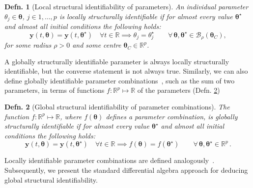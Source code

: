 \documentclass[12pt]{article}
\newtheorem{definition}{Defn.}
\begin{document}
\begin{definition}[Local structural identifiability of parameters]
  An individual parameter $\theta_{j}\in\boldsymbol{\theta}$, ${j}\in{1,\ldots,p}$ is locally \textit{structurally identifiable} if for almost every value $\boldsymbol{\theta}^{\star}$ and almost all initial conditions the following holds:
  \begin{equation}
    \mathbf{y}(t,\boldsymbol{\theta})=\mathbf{y}(t,\boldsymbol{\theta}^{\star})\quad\forall{t}\in\mathbb{R}\implies{\theta}_{j}=\theta_{j}^{\star}\quad\quad\forall\,\boldsymbol{\theta},\boldsymbol{\theta}^{\star}\in\mathcal{B}_{\rho}\left(\boldsymbol{\theta}_{C}\right),
    \label{eq:local_structural identifiability}
  \end{equation}
  for some radius $\rho>0$ and some centre $\boldsymbol{\theta}_{C}\in\mathbb{R}^p$. 
\label{def:local_structural identifiability}
\end{definition}

A globally structurally identifiable parameter is always locally structurally identifiable, but the converse statement is not always true. Similarly, we can also define globally identifiable parameter combinations~\cite{meshkat2015identifiability,meshkat2014repara}, such as the sum of two parameters, in terms of functions $f:\mathbb{R}^{p}\mapsto{\mathbb{R}}$ of the parameters (Defn. \ref{def:global_structural identifiability_comb})


\begin{definition}[Global structural identifiability of parameter combinations]
  The function $f:\mathbb{R}^{p}\mapsto{\mathbb{R}}$, where $f(\boldsymbol{\theta})$ defines a parameter combination, is globally \textit{structurally identifiable} if for almost every value $\boldsymbol{\theta}^{\star}$ and almost all initial conditions the following holds:
  \begin{equation}
    \mathbf{y}(t,\boldsymbol{\theta})=\mathbf{y}(t,\boldsymbol{\theta}^{\star})\quad\forall{t}\in\mathbb{R}\implies{f}(\boldsymbol{\theta})=f(\boldsymbol{\theta}^{\star})\quad\quad\forall\,\boldsymbol{\theta},\boldsymbol{\theta}^{\star}\in\mathbb{R}^{p}\,.
    \label{eq:global_structural identifiability_comb}
  \end{equation}
\label{def:global_structural identifiability_comb}
\end{definition}

Locally identifiable parameter combinations are defined analogously~\cite{meshkat2015identifiability,meshkat2014repara}. Subsequently, we present the standard differential algebra approach for deducing 
global structural identifiability. 
\end{document}
